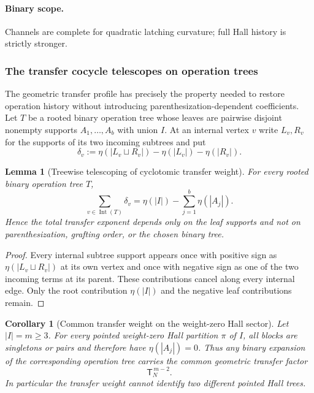 \documentclass[11pt]{article}
\newtheorem{lemma}[theorem]{Lemma}
\newtheorem{corollary}[theorem]{Corollary}
\theoremstyle{remark}
\begin{document}
\paragraph{Binary scope.}
Channels are complete for quadratic latching curvature; full Hall history is
strictly stronger.


\subsubsection{The transfer cocycle telescopes on operation trees}

The geometric transfer profile has precisely the property needed to restore
operation history without introducing parenthesization-dependent coefficients.
Let $T$ be a rooted binary operation tree whose leaves are pairwise disjoint
nonempty supports $A_1,\ldots,A_b$ with union $I$.  At an internal vertex $v$
write $L_v,R_v$ for the supports of its two incoming subtrees and put
\[
 \delta_v:=\eta(|L_v\sqcup R_v|)-\eta(|L_v|)-\eta(|R_v|).
\]

\begin{lemma}[Treewise telescoping of cyclotomic transfer weight]
\label{P2M-lem:v14-tree-transfer-telescoping}
For every rooted binary operation tree $T$,
\begin{equation}
 \boxed{
 \sum_{v\in\operatorname{Int}(T)}\delta_v
 =\eta(|I|)-\sum_{j=1}^{b}\eta(|A_j|).}
\end{equation}
Hence the total transfer exponent depends only on the leaf supports and not on
parenthesization, grafting order, or the chosen binary tree.
\end{lemma}

\begin{proof}
Every internal subtree support appears once with positive sign as
$\eta(|L_v\sqcup R_v|)$ at its own vertex and once with negative sign as one
of the two incoming terms at its parent.  These contributions cancel along
every internal edge.  Only the root contribution $\eta(|I|)$ and the negative
leaf contributions remain.
\end{proof}

\begin{corollary}[Common transfer weight on the weight-zero Hall sector]
\label{P2M-cor:v14-weight-zero-common-transfer}
Let $|I|=m\ge3$.  For every pointed weight-zero Hall partition $\pi$ of $I$,
all blocks are singletons or pairs and therefore have $\eta(|A_j|)=0$.  Thus
any binary expansion of the corresponding operation tree carries the common
geometric transfer factor
\begin{equation}
 \boxed{\mathsf T_N^{\,m-2}.}
\end{equation}
In particular the transfer weight cannot identify two different pointed Hall
trees.
\end{corollary}
\end{document}
